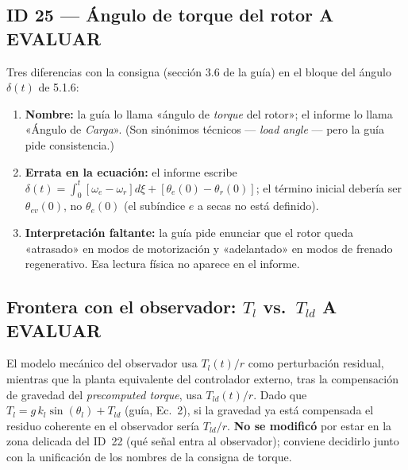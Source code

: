 \documentclass[11pt,a4paper]{article}
\newcommand{\evaluar}{\textcolor{warnorange}{\textbf{A EVALUAR}}}
\begin{document}
\subsection*{ID 25 --- Ángulo de torque del rotor \evaluar}
Tres diferencias con la consigna (sección 3.6 de la guía) en el bloque del ángulo $\delta(t)$ de 5.1.6:
\begin{enumerate}
  \item \textbf{Nombre:} la guía lo llama «ángulo de \emph{torque} del rotor»; el informe lo llama «Ángulo de \emph{Carga}». (Son sinónimos técnicos --- \emph{load angle} --- pero la guía pide consistencia.)
  \item \textbf{Errata en la ecuación:} el informe escribe $\delta(t) = \int_0^t[\omega_e-\omega_r]d\xi + [\theta_e(0)-\theta_r(0)]$; el término inicial debería ser $\theta_{ev}(0)$, no $\theta_e(0)$ (el subíndice $e$ a secas no está definido).
  \item \textbf{Interpretación faltante:} la guía pide enunciar que el rotor queda «atrasado» en modos de motorización y «adelantado» en modos de frenado regenerativo. Esa lectura física no aparece en el informe.
\end{enumerate}

\subsection*{Frontera con el observador: $T_l$ vs.\ $T_{ld}$ \evaluar}
El modelo mecánico del observador usa $T_l(t)/r$ como perturbación residual, mientras que la planta equivalente del controlador externo, tras la compensación de gravedad del \emph{precomputed torque}, usa $T_{ld}(t)/r$. Dado que $T_l = g\,k_l\sin(\theta_l)+T_{ld}$ (guía, Ec.~2), si la gravedad ya está compensada el residuo coherente en el observador sería $T_{ld}/r$. \textbf{No se modificó} por estar en la zona delicada del ID~22 (qué señal entra al observador); conviene decidirlo junto con la unificación de los nombres de la consigna de torque.

\end{document}
